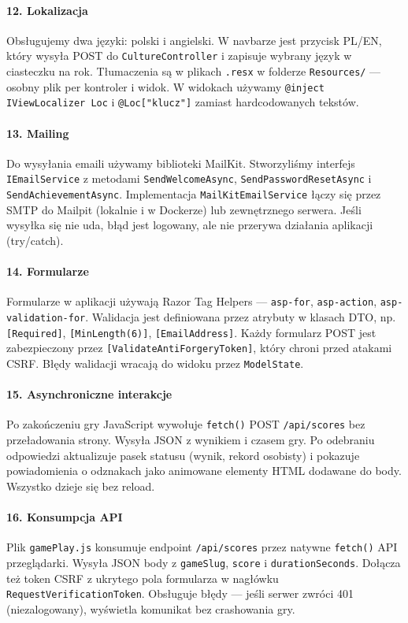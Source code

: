 \documentclass[12pt,a4paper]{article}
\newcommand{\code}[1]{\texttt{\small#1}}
\begin{document}
\paragraph{12. Lokalizacja}
Obsługujemy dwa języki: polski i angielski. W navbarze jest przycisk PL/EN, który wysyła POST do
\code{CultureController} i zapisuje wybrany język w ciasteczku na rok. Tłumaczenia są w plikach \code{.resx}
w folderze \code{Resources/} --- osobny plik per kontroler i widok. W widokach używamy
\code{@inject IViewLocalizer Loc} i \code{@Loc["klucz"]} zamiast hardcodowanych tekstów.

\paragraph{13. Mailing}
Do wysyłania emaili używamy biblioteki MailKit. Stworzyliśmy interfejs \code{IEmailService} z metodami
\code{SendWelcomeAsync}, \code{SendPasswordResetAsync} i \code{SendAchievementAsync}. Implementacja
\code{MailKitEmailService} łączy się przez SMTP do Mailpit (lokalnie i w Dockerze) lub zewnętrznego serwera.
Jeśli wysyłka się nie uda, błąd jest logowany, ale nie przerywa działania aplikacji (try/catch).

\paragraph{14. Formularze}
Formularze w aplikacji używają Razor Tag Helpers --- \code{asp-for}, \code{asp-action},
\code{asp-validation-for}. Walidacja jest definiowana przez atrybuty w klasach DTO, np. \code{[Required]},
\code{[MinLength(6)]}, \code{[EmailAddress]}. Każdy formularz POST jest zabezpieczony przez
\code{[ValidateAntiForgeryToken]}, który chroni przed atakami CSRF. Błędy walidacji wracają do widoku
przez \code{ModelState}.

\paragraph{15. Asynchroniczne interakcje}
Po zakończeniu gry JavaScript wywołuje \code{fetch()} POST \code{/api/scores} bez przeładowania strony.
Wysyła JSON z wynikiem i czasem gry. Po odebraniu odpowiedzi aktualizuje pasek statusu (wynik, rekord osobisty)
i pokazuje powiadomienia o odznakach jako animowane elementy HTML dodawane do body. Wszystko dzieje się bez reload.

\paragraph{16. Konsumpcja API}
Plik \code{gamePlay.js} konsumuje endpoint \code{/api/scores} przez natywne \code{fetch()} API przeglądarki.
Wysyła JSON body z \code{gameSlug}, \code{score} i \code{durationSeconds}. Dołącza też token CSRF z ukrytego
pola formularza w nagłówku \code{RequestVerificationToken}. Obsługuje błędy --- jeśli serwer zwróci 401
(niezalogowany), wyświetla komunikat bez crashowania gry.
\end{document}
